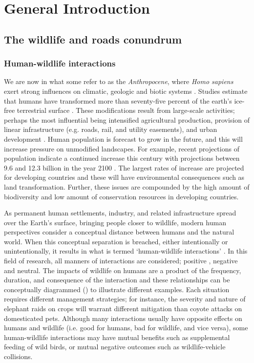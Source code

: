 \chapter{General Introduction}\label{sec:intro}
\newpage

\section{The wildlife and roads conundrum}

\subsection{Human-wildlife interactions}

We are now in what some refer to as the \textit{Anthropocene}, where \textit{Homo sapiens} exert strong influences on climatic, geologic and biotic systems \citep{crut06}. Studies estimate that humans have transformed more than seventy-five percent of the earth's ice-free terrestrial surface \citep[e.g.][]{elli08}. These modifications result from large-scale activities; perhaps the most influential being intensified agricultural production, provision of linear infrastructure (e.g. roads, rail, and utility easements), and urban development \citep{vito97,sand02,fole05}. Human population is forecast to grow in the future, and this will increase pressure on unmodified landscapes. For example, recent projections of population indicate a continued increase this century with projections between 9.6 and 12.3 billion in the year 2100 \citep{gerl14}. The largest rates of increase are projected for developing countries and these will have environmental consequences such as land transformation. Further, these issues are compounded by the high amount of biodiversity and low amount of conservation resources in developing countries. 

As permanent human settlements, industry, and related infrastructure spread over the Earth's surface, bringing people closer to wildlife, modern human perspectives consider a conceptual distance between humans and the natural world. When this conceptual separation is breached, either intentionally or unintentionally, it results in what is termed `human-wildlife interactions' \citep[see][]{manf08}. In this field of research, all manners of interactions are considered; positive \citep{dall12}, negative \citep{jone99} and neutral. The impacts of wildlife on humans are a product of the frequency, duration, and consequence of the interaction and these relationships can be conceptually diagrammed () to illustrate different examples. Each situation requires different management strategies; for instance, the severity and nature of elephant raids on crops will warrant different mitigation than coyote attacks on domesticated pets. Although many interactions usually have opposite effects on humans and wildlife (i.e. good for humans, bad for wildlife, and vice versa), some human-wildlife interactions may have mutual benefits such as supplemental feeding of wild birds, or mutual negative outcomes such as wildlife-vehicle collisions.

